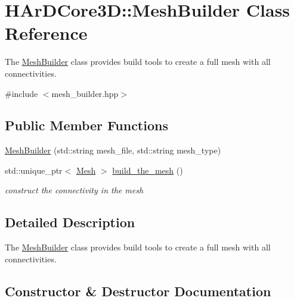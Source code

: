 \hypertarget{classHArDCore3D_1_1MeshBuilder}{}\section{H\+Ar\+D\+Core3D\+:\+:Mesh\+Builder Class Reference}
\label{classHArDCore3D_1_1MeshBuilder}


The \hyperlink{classHArDCore3D_1_1MeshBuilder}{Mesh\+Builder} class provides build tools to create a full mesh with all connectivities.  




{\ttfamily \#include $<$mesh\+\_\+builder.\+hpp$>$}

\subsection*{Public Member Functions}
\begin{DoxyCompactItemize}
\item 
\hyperlink{classHArDCore3D_1_1MeshBuilder_ab40a9ca5099b1b098e7aa5810adf6a7b}{Mesh\+Builder} (std\+::string mesh\+\_\+file, std\+::string mesh\+\_\+type)
\item 
std\+::unique\+\_\+ptr$<$ \hyperlink{classHArDCore3D_1_1Mesh}{Mesh} $>$ \hyperlink{classHArDCore3D_1_1MeshBuilder_a208c94e8cb6490226215b59eb67e7911}{build\+\_\+the\+\_\+mesh} ()
\begin{DoxyCompactList}\small\item\em construct the connectivity in the mesh \end{DoxyCompactList}\end{DoxyCompactItemize}


\subsection{Detailed Description}
The \hyperlink{classHArDCore3D_1_1MeshBuilder}{Mesh\+Builder} class provides build tools to create a full mesh with all connectivities. 

\subsection{Constructor \& Destructor Documentation}
\mbox{\label{classHArDCore3D_1_1MeshBuilder_ab40a9ca5099b1b098e7aa5810adf6a7b}} 
